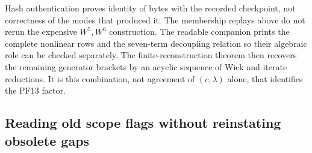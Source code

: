 Hash authentication proves identity of bytes with the recorded
checkpoint, not correctness of the modes that produced it. The
membership replays above do not rerun the expensive $W^5,W^6$
construction. The readable companion prints the complete nonlinear
rows and the seven-term decoupling relation so their algebraic
role can be checked separately. The finite-reconstruction theorem
then recovers the remaining generator brackets by an acyclic
sequence of Wick and iterate reductions. It is this combination,
not agreement of $(c,\lambda)$ alone, that identifies the PF13
factor.

\subsection{Reading old scope flags without reinstating obsolete gaps}

